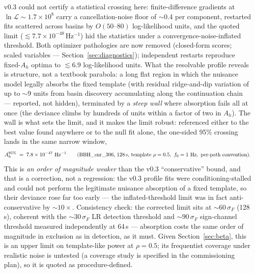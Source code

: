 \documentclass[11pt]{article}
\newcommand{\Ah}{A_h}
\begin{document}
v0.3 could not certify a statistical crossing here: finite-difference gradients at $\ln\mathcal{L} \sim 1.7\times10^{8}$ carry a cancellation-noise floor of $\sim$0.4 per component, restarted fits scattered across basins by $O(50\text{--}80)$ log-likelihood units, and the quoted limit ($\lesssim 7.7\times10^{-48}\,\mathrm{Hz^{-1}}$) hid the statistics under a convergence-noise-inflated threshold. Both optimizer pathologies are now removed (closed-form scores; scaled variables --- Section~\ref{sec:diagnostics}); independent restarts reproduce fixed-$\Ah$ optima to $\lesssim 6.9$ log-likelihood units. What the resolvable profile reveals is structure, not a textbook parabola: a long flat region in which the nuisance model legally absorbs the fixed template (with residual ridge-and-dip variation of up to $\sim$9 units from basin discovery accumulating along the continuation chain --- reported, not hidden), terminated by a \emph{steep wall} where absorption fails all at once (the deviance climbs by hundreds of units within a factor of two in $\Ah$). The wall is what sets the limit, and it makes the limit robust: referenced either to the best value found anywhere or to the null fit alone, the one-sided 95\% crossing lands in the same narrow window,
\begin{equation}
\Ah^{95\%} \;=\; 7.8\times10^{-47}~\mathrm{Hz^{-1}}
\qquad (\text{BBH\_snr\_306, 128\,s, template } \rho = 0.5,\ f_0 = 1~\mathrm{Hz},\ \text{per-path convention}).
\end{equation}
This is \emph{an order of magnitude weaker} than the v0.3 ``conservative'' bound, and that is a correction, not a regression: the v0.3 profile fits were conditioning-stalled and could not perform the legitimate nuisance absorption of a fixed template, so their deviance rose far too early --- the inflated-threshold limit was in fact anti-conservative by $\sim$$10\times$. Consistency check: the corrected limit sits at $\sim$$60\,\sigma_F$ (128\,s), coherent with the $\sim$$30\,\sigma_F$ LR detection threshold and $\sim$$90\,\sigma_F$ sign-channel threshold measured independently at 64\,s --- absorption costs the same order of magnitude in exclusion as in detection, as it must. Given Section~\ref{sec:beta}, this is an upper limit on template-like power at $\rho = 0.5$; its frequentist coverage under realistic noise is untested (a coverage study is specified in the commissioning plan), so it is quoted as procedure-defined.
\end{document}
